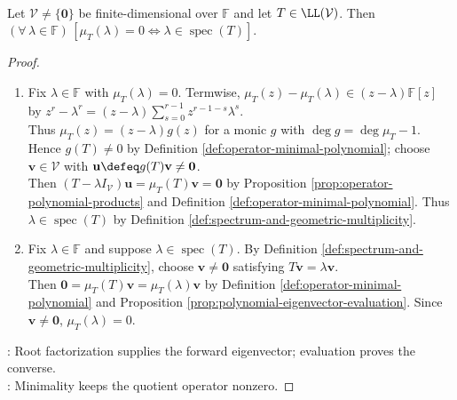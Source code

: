 \begin{theorem} \label{thm:operator-minimal-polynomial-roots-eigenvalues} \\
Let $\mathcal{V}\neq\{\mathbf{0}\}$ be finite-dimensional over $\mathbb{F}$ and let $T\in\LL(\mathcal{V})$. Then $(\forall\,\lambda\in\mathbb{F})\,[\mu_T(\lambda)=0\Longleftrightarrow\lambda\in\operatorname{spec}(T)]$.
\begin{proof}
\begin{enumerate}[label=\roman*.]
\setlength{\itemsep}{0pt}
\item[$(\Rightarrow)$] Fix $\lambda\in\mathbb{F}$ with $\mu_T(\lambda)=0$. Termwise, $\mu_T(z)-\mu_T(\lambda)\in(z-\lambda)\mathbb{F}[z]$ by $z^r-\lambda^r=(z-\lambda)\sum\limits_{s=0}^{r-1}z^{r-1-s}\lambda^s$.\\
Thus $\mu_T(z)=(z-\lambda)g(z)$ for a monic $g$ with $\deg g=\deg\mu_T-1$.\\
Hence $g(T)\neq0$ by Definition \ref{def:operator-minimal-polynomial}; choose $\mathbf{v}\in\mathcal{V}$ with $\mathbf{u}\defeq g(T)\mathbf{v}\neq\mathbf{0}$.\\
Then $(T-\lambda I_{\mathcal{V}})\mathbf{u}=\mu_T(T)\mathbf{v}=\mathbf{0}$ by Proposition \ref{prop:operator-polynomial-products} and Definition \ref{def:operator-minimal-polynomial}. Thus $\lambda\in\operatorname{spec}(T)$ by Definition \ref{def:spectrum-and-geometric-multiplicity}.
\item[$(\Leftarrow)$] Fix $\lambda\in\mathbb{F}$ and suppose $\lambda\in\operatorname{spec}(T)$. By Definition \ref{def:spectrum-and-geometric-multiplicity}, choose $\mathbf{v}\neq\mathbf{0}$ satisfying $T\mathbf{v}=\lambda\mathbf{v}$.\\
Then $\mathbf{0}=\mu_T(T)\mathbf{v}=\mu_T(\lambda)\mathbf{v}$ by Definition \ref{def:operator-minimal-polynomial} and Proposition \ref{prop:polynomial-eigenvector-evaluation}. Since $\mathbf{v}\neq\mathbf{0}$, $\mu_T(\lambda)=0$.
\end{enumerate}
: Root factorization supplies the forward eigenvector; evaluation proves the converse.\\
: Minimality keeps the quotient operator nonzero.
\end{proof}
\end{theorem}

